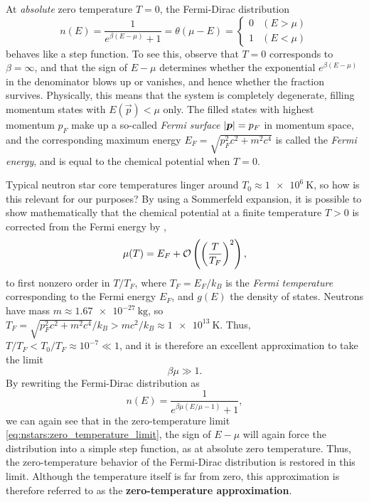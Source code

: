 At \emph{absolute} zero temperature $T = 0$, the Fermi-Dirac distribution
\begin{equation}
	n(E) = \frac{1}{e^{\beta (E - \mu)} + 1} = \theta(\mu-E) = \begin{cases} 0 & (E > \mu) \\ 1 & (E < \mu) \end{cases}
\end{equation}
behaves like a step function.
To see this, observe that $T = 0$ corresponds to $\beta = \infty$, and that the sign of $E - \mu$ determines whether the exponential $e^{\beta (E - \mu)}$ in the denominator blows up or vanishes, and hence whether the fraction survives.
Physically, this means that the system is completely degenerate, filling momentum states with $E(\vec{p}) < \mu$ only.
The filled states with highest momentum $p_F$ make up a so-called \emph{Fermi surface} $\left\lvert {\bm{p}} \right\rvert = p_F$ in momentum space, and the corresponding maximum energy $E_F = \sqrt{p_F^2 c^2 + m^2 c^4}$ is called the \emph{Fermi energy}, and is equal to the chemical potential when $T = 0$.

Typical neutron star core temperatures linger around $T_0 \approx \SI{1e6}{\kelvin}$, \cite{ref:glendenning} so how is this relevant for our purposes?
By using a Sommerfeld expansion, it is possible to show mathematically that the chemical potential at a finite temperature $T > 0$ is corrected from the Fermi energy by
\cite[section 3.6]{ref:notes_statistical_physics_tong}, \cite[exercise 2]{ref:eth_statistical_physics_exercise}
\begin{equation}
	\mu(T) = E_F + \mathcal{O} \left( \left( \frac{T}{T_F} \right)^2 \right) ,
\end{equation}
to first nonzero order in $T/T_F$, where $T_F = E_F / k_B$ is the \emph{Fermi temperature} corresponding to the Fermi energy $E_F$, and $g(E)$ the density of states.
Neutrons have mass $m \approx \SI{1.67e-27}{\kilogram}$, so $T_F = \sqrt{p_F^2 c^2 + m^2 c^4} / k_B > m c^2 / k_B \approx \SI{1e13}{\kelvin}$.
Thus, $T / T_F < T_0 / T_F \approx 10^{-7} \ll 1$, and it is therefore an excellent approximation to take the limit
\begin{equation}
	\beta \mu \gg 1 .
\end{equation}
By rewriting the Fermi-Dirac distribution as
\begin{equation}
	n(E) = \frac{1}{e^{\beta \mu (E/\mu - 1)} + 1} ,
\label{eq:nstars:zero_temperature_limit}
\end{equation}
we can again see that in the zero-temperature limit \eqref{eq:nstars:zero_temperature_limit}, the sign of $E - \mu$ will again force the distribution into a simple step function, as at absolute zero temperature.
Thus, the zero-temperature behavior of the Fermi-Dirac distribution is restored in this limit.
Although the temperature itself is far from zero, this approximation is therefore referred to as the \textbf{zero-temperature approximation}.

